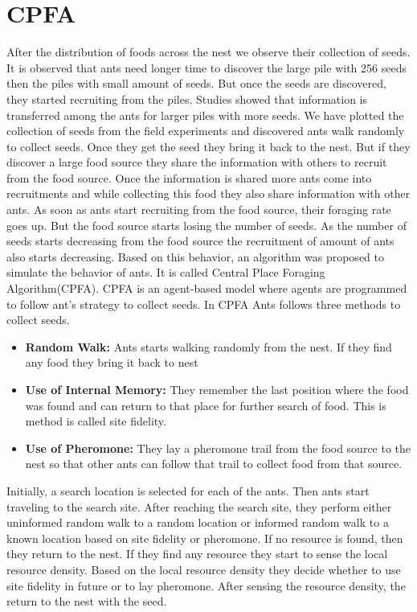 \section{\label{section:CPFA}CPFA}
After the distribution of foods across the nest we observe their collection of seeds. It is observed that ants need longer time to discover the large pile with 256 seeds then the piles with small amount of seeds. But once the seeds are discovered, they started recruiting from the piles. Studies showed that information is transferred among the ants for larger piles with more seeds. We have plotted the collection of seeds from the field experiments and discovered ants walk randomly to collect seeds. Once they get the seed they bring it back to the nest. But if they discover a large food source they share the information with others to recruit from the food source. Once the information is shared more ants come into recruitments and while collecting this food they also share information with other ants. As soon as ants start recruiting from the food source, their foraging rate goes up. But the food source starts losing the number of seeds. As the number of seeds starts decreasing from the food source the recruitment of amount of ants also starts decreasing. Based on this behavior, an algorithm was proposed to simulate the behavior of ants. It is called Central Place Foraging Algorithm(CPFA). CPFA is an agent-based model where agents are programmed to follow ant’s strategy to collect seeds. In CPFA Ants follows three methods to collect seeds.
\begin{itemize}
	\item \textbf{Random Walk:} Ants starts walking randomly from the nest. If they find any food they bring it back to nest
	\item \textbf{Use of Internal Memory:} They remember the last position where the food was found and can return to that place for further search of food. This is method is called site fidelity.
	\item \textbf{Use of Pheromone:} They lay a pheromone trail from the food source to the nest so that other ants can follow that trail to collect food from that source.	
\end{itemize} 
Initially, a search location is selected for each of the ants. Then ants start traveling to the search site. After reaching the search site, they perform either uninformed random walk to a random location or informed random walk to a known location based on site fidelity or pheromone. If no resource is found, then they return to the nest. If they find any resource they start to sense the local resource density. Based on the local resource density they decide whether to use site fidelity in future or to lay pheromone. After sensing the resource density, the return to the nest with the seed. 
